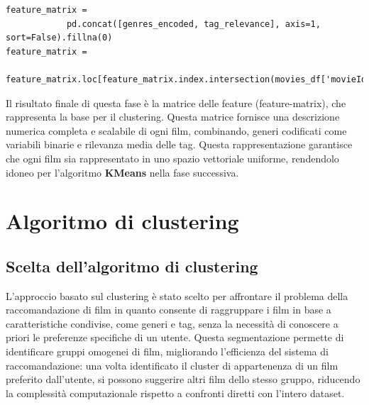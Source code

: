 \documentclass[a4paper,12pt]{article}
\begin{document}
\begin{enumerate}
\begin{itemize}
							\end{itemize}
\begin{verbatim}
feature_matrix = 
			pd.concat([genres_encoded, tag_relevance], axis=1, sort=False).fillna(0)
feature_matrix = 
			feature_matrix.loc[feature_matrix.index.intersection(movies_df['movieId'])]
\end{verbatim}
					Il risultato finale di questa fase è la matrice delle feature (feature-matrix), che rappresenta la base per il clustering. Questa matrice fornisce una descrizione numerica completa e scalabile di ogni film, combinando, generi codificati come variabili binarie e rilevanza media delle tag. Questa rappresentazione garantisce che ogni film sia rappresentato in uno spazio vettoriale uniforme, rendendolo idoneo per l'algoritmo \textbf{KMeans} nella fase successiva.

		\end{enumerate}
\newpage
\section{Algoritmo di clustering}
    \subsection{Scelta dell’algoritmo di clustering}
L'approccio basato sul clustering è stato scelto per affrontare il problema della raccomandazione di film in quanto consente di raggruppare i film in base a caratteristiche condivise, come generi e tag, senza la necessità di conoscere a priori le preferenze specifiche di un utente. Questa segmentazione permette di identificare gruppi omogenei di film, migliorando l'efficienza del sistema di raccomandazione: una volta identificato il cluster di appartenenza di un film preferito dall’utente, si possono suggerire altri film dello stesso gruppo, riducendo la complessità computazionale rispetto a confronti diretti con l’intero dataset.
\end{document}
